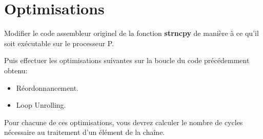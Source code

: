 \section{Optimisations}

Modifier le code assembleur originel de la fonction \textbf{strncpy} de
mani\`ere \`a ce qu'il soit ex\'ecutable sur le processeur P.

Puis effectuer les optimisations suivantes sur la boucle du code
pr\'ec\'edemment obtenu:

\begin{itemize}
  \item
    R\'eordonnancement.
  \item
    Loop Unrolling.
\end{itemize}

Pour chacune de ces optimisations, vous devrez calculer le nombre de cycles
n\'ecessaire au traitement d'un \'el\'ement de la cha\^ine.

